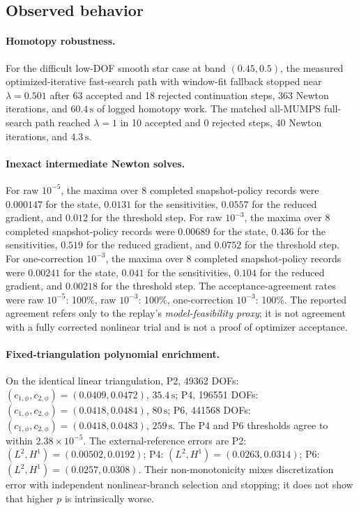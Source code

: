 \subsection{Observed behavior}

\paragraph{Homotopy robustness.} For the difficult low-DOF smooth star case at band \((0.45,0.5)\), the measured optimized-iterative fast-search path with window-fit fallback stopped near \(\lambda=0.501\) after 63 accepted and 18 rejected continuation steps, 363 Newton iterations, and \(60.4\,\mathrm{s}\) of logged homotopy work.  The matched all-MUMPS full-search path reached \(\lambda=1\) in 10 accepted and 0 rejected steps, 40 Newton iterations, and \(4.3\,\mathrm{s}\).

\paragraph{Inexact intermediate Newton solves.} For raw \(10^{-5}\), the maxima over 8 completed snapshot-policy records were \(0.000147\) for the state, \(0.0131\) for the sensitivities, \(0.0557\) for the reduced gradient, and \(0.012\) for the threshold step.  For raw \(10^{-3}\), the maxima over 8 completed snapshot-policy records were \(0.00689\) for the state, \(0.436\) for the sensitivities, \(0.519\) for the reduced gradient, and \(0.0752\) for the threshold step.  For one-correction \(10^{-3}\), the maxima over 8 completed snapshot-policy records were \(0.00241\) for the state, \(0.041\) for the sensitivities, \(0.104\) for the reduced gradient, and \(0.00218\) for the threshold step.  The acceptance-agreement rates were raw \(10^{-5}\): 100\%, raw \(10^{-3}\): 100\%, one-correction \(10^{-3}\): 100\%.  The reported agreement refers only to the replay's \emph{model-feasibility proxy}; it is not agreement with a fully corrected nonlinear trial and is not a proof of optimizer acceptance.

\paragraph{Fixed-triangulation polynomial enrichment.} On the identical linear triangulation, P2, 49362 DOFs: \((c_{1,\phi},c_{2,\phi})=(0.0409,0.0472)\), \(35.4\,\mathrm{s}\); P4, 196551 DOFs: \((c_{1,\phi},c_{2,\phi})=(0.0418,0.0484)\), \(80\,\mathrm{s}\); P6, 441568 DOFs: \((c_{1,\phi},c_{2,\phi})=(0.0418,0.0483)\), \(259\,\mathrm{s}\).  The P4 and P6 thresholds agree to within \(2.38\times 10^{-5}\).  The external-reference errors are P2: \((L^2,H^1)=(0.00502,0.0192)\); P4: \((L^2,H^1)=(0.0263,0.0314)\); P6: \((L^2,H^1)=(0.0257,0.0308)\).  Their non-monotonicity mixes discretization error with independent nonlinear-branch selection and stopping; it does not show that higher \(p\) is intrinsically worse.

